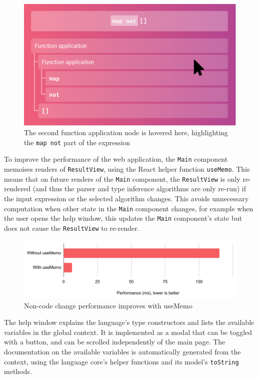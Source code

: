 \documentclass[a4paper,fleqn,oneside,12pt]{report}
\begin{document}
{\centering \begin{figure}[h!]
  \centering
  \includegraphics[width=0.9\linewidth]{images/ast_view_hover.png}
  \caption{The second function application node is hovered here, highlighting the \texttt{map not} part of the expression}
\end{figure} \par}

To improve the performance of the web application, the \texttt{Main} component memoises renders of \texttt{ResultView}, using the React helper function \texttt{useMemo}. This means that on future renders of the \texttt{Main} component, the \texttt{ResultView} is only re-rendered (and thus the parser and type inference algorithms are only re-run) if the input expression or the selected algorithm changes. This avoids unnecessary computation when other state in the \texttt{Main} component changes, for example when the user opens the help window, this updates the \texttt{Main} component's state but does not cause the \texttt{ResultView} to re-render.

{\centering \begin{figure}[h!]
  \centering
  \includegraphics[width=0.9\linewidth]{images/useMemo_performance.pdf}
  \caption{Non-code change performance improves with useMemo}
\end{figure} \par}

The help window explains the language's type constructors and lists the available variables in the global context. It is implemented as a modal that can be toggled with a button, and can be scrolled independently of the main page. The documentation on the available variables is automatically generated from the context, using the language core's helper functions and its model's \texttt{toString} methods.
\end{document}

